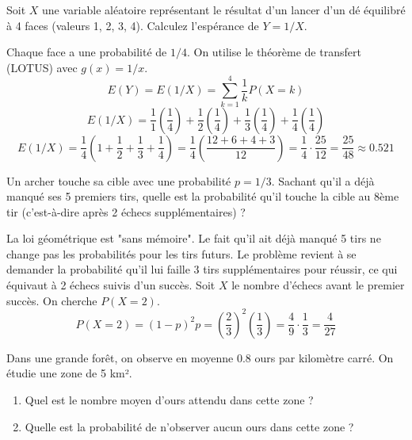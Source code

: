 \begin{exercicebox}
Soit $X$ une variable aléatoire représentant le résultat d'un lancer d'un dé équilibré à 4 faces (valeurs 1, 2, 3, 4). Calculez l'espérance de $Y = 1/X$.
\end{exercicebox}

\begin{correctionbox}
Chaque face a une probabilité de $1/4$. On utilise le théorème de transfert (LOTUS) avec $g(x) = 1/x$.
$$ E(Y) = E(1/X) = \sum_{k=1}^4 \frac{1}{k} P(X=k) $$
$$ E(1/X) = \frac{1}{1}\left(\frac{1}{4}\right) + \frac{1}{2}\left(\frac{1}{4}\right) + \frac{1}{3}\left(\frac{1}{4}\right) + \frac{1}{4}\left(\frac{1}{4}\right) $$
$$ E(1/X) = \frac{1}{4} \left(1 + \frac{1}{2} + \frac{1}{3} + \frac{1}{4}\right) = \frac{1}{4} \left(\frac{12+6+4+3}{12}\right) = \frac{1}{4} \cdot \frac{25}{12} = \frac{25}{48} \approx 0.521 $$
\end{correctionbox}

\begin{exercicebox}
Un archer touche sa cible avec une probabilité $p=1/3$. Sachant qu'il a déjà manqué ses 5 premiers tirs, quelle est la probabilité qu'il touche la cible au 8ème tir (c'est-à-dire après 2 échecs supplémentaires) ?
\end{exercicebox}

\begin{correctionbox}
La loi géométrique est "sans mémoire". Le fait qu'il ait déjà manqué 5 tirs ne change pas les probabilités pour les tirs futurs. Le problème revient à se demander la probabilité qu'il lui faille 3 tirs supplémentaires pour réussir, ce qui équivaut à 2 échecs suivis d'un succès.
Soit $X$ le nombre d'échecs avant le premier succès. On cherche $P(X=2)$.
$$ P(X=2) = (1-p)^2 p = \left(\frac{2}{3}\right)^2 \left(\frac{1}{3}\right) = \frac{4}{9} \cdot \frac{1}{3} = \frac{4}{27} $$
\end{correctionbox}

\begin{exercicebox}
Dans une grande forêt, on observe en moyenne 0.8 ours par kilomètre carré. On étudie une zone de 5 km².
\begin{enumerate}
    \item Quel est le nombre moyen d'ours attendu dans cette zone ?
    \item Quelle est la probabilité de n'observer aucun ours dans cette zone ?
\end{enumerate}
\end{exercicebox}

